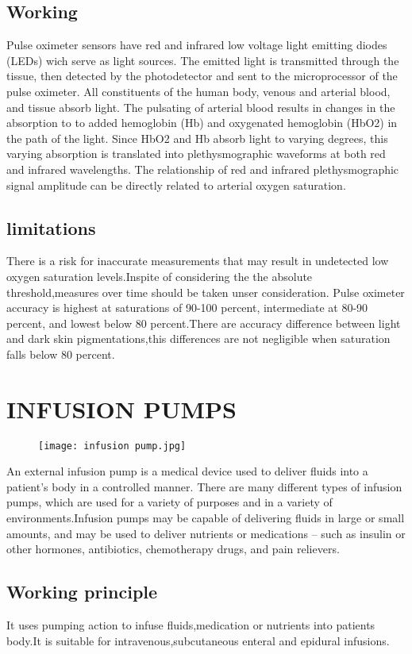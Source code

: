 \documentclass[12pt]{article}
\begin{document}
\subsection{Working}

Pulse oximeter sensors have red and infrared low voltage
light emitting diodes (LEDs) wich serve as light sources. The
emitted light is transmitted through the tissue, then detected
by the photodetector and sent to the microprocessor of the
pulse oximeter. All constituents of the human
body, venous and arterial blood, and tissue absorb light. The pulsating of arterial blood results in changes
in the absorption to to added hemoglobin (Hb) and
oxygenated hemoglobin (HbO2) in the path of the light.
Since HbO2 and Hb absorb light to varying degrees, this
varying absorption is translated into plethysmographic
waveforms at both red and infrared wavelengths.
The relationship of red and infrared plethysmographic signal
amplitude can be directly related to arterial oxygen
saturation. 
\subsection{limitations}
There is a risk for inaccurate measurements that may result in undetected low oxygen saturation levels.Inspite of considering the the absolute threshold,measures over time should be taken unser consideration. Pulse oximeter accuracy is highest at saturations of 90-100 percent, intermediate at 80-90 percent, and lowest below 80 percent.There are accuracy difference between light and dark skin pigmentations,this differences are not negligible when saturation falls below 80 percent.
\section{INFUSION PUMPS}
\begin{figure}
\centering
\texttt{[image: infusion pump.jpg]}
\end{figure}
An external infusion pump is a medical device used to deliver fluids into a patient’s body in a controlled manner. There are many different types of infusion pumps, which are used for a variety of purposes and in a variety of environments.Infusion pumps may be capable of delivering fluids in large or small amounts, and may be used to deliver nutrients or medications – such as insulin or other hormones, antibiotics, chemotherapy drugs, and pain relievers.
\subsection{Working principle}
It uses pumping action to infuse fluids,medication or nutrients into patients body.It is suitable for intravenous,subcutaneous enteral and epidural infusions.
\end{document}
